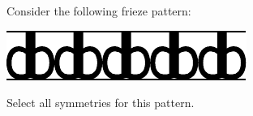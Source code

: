 \documentclass{ximera}
\author{Bart Snapp}
\begin{document}
\begin{exercise}
  Consider the following frieze pattern:
  \begin{image}
  \includegraphics{fph16.pdf}
  \end{image}
  Select all symmetries for this pattern.
  \begin{selectAll}
  \end{selectAll}
\end{exercise}
\end{document}
